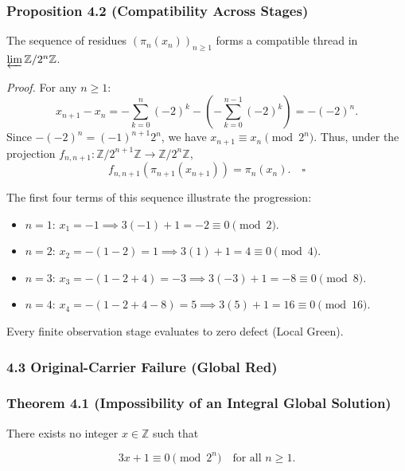 \documentclass[
  11pt,
]{article}
\providecommand{\tightlist}{%
  \setlength{\itemsep}{0pt}\setlength{\parskip}{0pt}}
\theoremstyle{plain}
\theoremstyle{definition}\newtheorem{definition}[theorem]{Definition}
\theoremstyle{remark}\newtheorem*{remark}{Remark}
\begin{document}
\subsubsection{Proposition 4.2 (Compatibility Across
Stages)}\label{proposition-4.2-compatibility-across-stages}

The sequence of residues \((\pi_n(x_n))_{n \ge 1}\) forms a compatible
thread in \(\varprojlim \mathbb{Z}/2^n\mathbb{Z}\).

\emph{Proof.} For any \(n \ge 1\): \[
x_{n+1} - x_n = -\sum_{k=0}^n (-2)^k - \left( -\sum_{k=0}^{n-1} (-2)^k \right) = -(-2)^n.
\] Since \(-(-2)^n = (-1)^{n+1} 2^n\), we have
\(x_{n+1} \equiv x_n \pmod{2^n}\). Thus, under the projection
\(f_{n,n+1}: \mathbb{Z}/2^{n+1}\mathbb{Z} \to \mathbb{Z}/2^n\mathbb{Z}\),
\[
f_{n,n+1}(\pi_{n+1}(x_{n+1})) = \pi_n(x_n). \quad \square
\]

The first four terms of this sequence illustrate the progression:

\begin{itemize}
\tightlist
\item
  \(n = 1\): \(x_1 = -1 \implies 3(-1) + 1 = -2 \equiv 0 \pmod 2\).
\item
  \(n = 2\):
  \(x_2 = -(1 - 2) = 1 \implies 3(1) + 1 = 4 \equiv 0 \pmod 4\).
\item
  \(n = 3\):
  \(x_3 = -(1 - 2 + 4) = -3 \implies 3(-3) + 1 = -8 \equiv 0 \pmod 8\).
\item
  \(n = 4\):
  \(x_4 = -(1 - 2 + 4 - 8) = 5 \implies 3(5) + 1 = 16 \equiv 0 \pmod{16}\).
\end{itemize}

Every finite observation stage evaluates to zero defect (Local Green).

\subsubsection{4.3 Original-Carrier Failure (Global
Red)}\label{original-carrier-failure-global-red}

\subsubsection{Theorem 4.1 (Impossibility of an Integral Global
Solution)}\label{theorem-4.1-impossibility-of-an-integral-global-solution}

There exists no integer \(x \in \mathbb{Z}\) such that

\[
3x + 1 \equiv 0 \pmod{2^n} \quad \text{for all } n \ge 1.
\]
\end{document}
